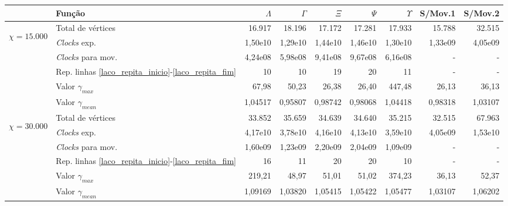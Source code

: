 \begin{table}
\begin{center}
\begin{tabular}{|c|l|r|r|r|r|r|r|r|} %
\hline
& Função & $\Lambda$ & $\Gamma$ & $\Xi$ & $\Psi$ & $\Upsilon$ & S/Mov.1 & S/Mov.2 \\
\hline %
\multirow{5}{*}{\begin{sideways}$\chi = 15.000$\end{sideways} } 
& Total de vértices                                                     & 16.917 & 18.196 & 17.172 & 17.281 & 17.933 & 15.788 & 32.515 \\
& {\it Clocks} exp.	                                             	& 1,50e10 & 1,29e10 & 1,44e10 & 1,46e10 & 1,30e10 & 1,33e09 & 4,05e09 \\
& {\it Clocks} para mov.                                      		& 4,24e08 & 5,98e08 & 9,41e08 & 9,67e08 & 6,16e08 & - & - \\
& Rep. linhas \ref{laco_repita_inicio}-\ref{laco_repita_fim} 		& 10 & 10 & 19 & 20 & 11 & - & - \\
& Valor $\gamma_{max}$							& 67,98 & 50,23 & 26,38 & 26,40 & 447,48 & 26,13 & 36,13 \\
& Valor $\gamma_{mean}$							& 1,04517 & 0,95807 & 0,98742 & 0,98068 & 1,04418 & 0,98318 & 1,03107 \\
\hline %
\multirow{5}{*}{\begin{sideways}$\chi = 30.000$\end{sideways} } 
& Total de vértices                                                     & 33.852 & 35.659 & 34.639 & 34.640 & 35.215 & 32.515 & 67.963 \\
& {\it Clocks} exp.	                                             	& 4,17e10 & 3,78e10 & 4,16e10 & 4,13e10 & 3,59e10 & 4,05e09 & 1,53e10 \\
& {\it Clocks} para mov.                                      		& 1,60e09 & 1,23e09 & 2,20e09 & 2,04e09 & 1,09e09 & - & - \\
& Rep. linhas \ref{laco_repita_inicio}-\ref{laco_repita_fim} 		& 16 & 11 & 20 & 20 & 10 & - & - \\
& Valor $\gamma_{max}$							& 219,21 & 48,97 & 51,01 & 51,02 & 374,23 & 36,13 & 52,37 \\
& Valor $\gamma_{mean}$							& 1,09169 & 1,03820 & 1,05415 & 1,05422 & 1,05477 & 1,03107 & 1,06202 \\

\end{tabular}
\end{center}
\end{table}
